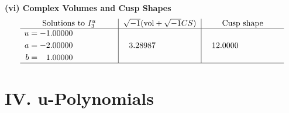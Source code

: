 \documentclass[1p]{elsarticle_modified}
\theoremstyle{definition}
\newcommand{\I}{\sqrt{-1}}
\begin{document}
\newpage\flushleft \textbf{(vi) Complex Volumes and Cusp Shapes}
$$\begin{array}{c|c|c}  
\text{Solutions to }I^u_{3}& \I (\text{vol} + \sqrt{-1}CS) & \text{Cusp shape}\\
 \hline 
\begin{aligned}
u &= -1.00000\phantom{ +0.000000I} \\
a &= -2.00000\phantom{ +0.000000I} \\
b &= \phantom{-}1.00000\phantom{ +0.000000I}\end{aligned}
 & \phantom{-}3.28987\phantom{ +0.000000I} & \phantom{-}12.0000\phantom{ +0.000000I}\\
 \hline 
 \end{array}$$\newpage
\newpage\renewcommand{\arraystretch}{1}
\centering \section*{ IV. u-Polynomials}
\end{document}
